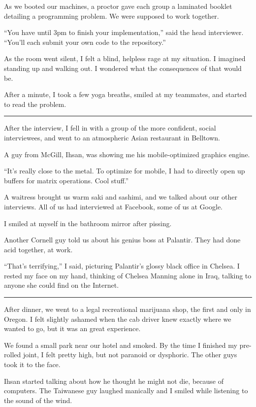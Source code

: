 As we booted our machines, a proctor gave each group a laminated booklet
detailing a programming problem.  We were supposed to work together.

``You have until 3pm to finish your implementation,'' said the head interviewer.
``You'll each submit your own code to the repository.''

As the room went silent, I felt a blind, helpless rage at my situation.  I
imagined standing up and walking out.  I wondered what the consequences of that
would be.  

After a minute, I took a few yoga breaths, smiled at my teammates, and started
to read the problem.

\plainfancybreak{12pt}{2}{* * *}

After the interview, I fell in with a group of the more confident, social
interviewees, and went to an atmospheric Asian restaurant in Belltown.

A guy from McGill, Ihsan, was showing me his mobile-optimized graphics engine.

``It's really close to the metal.  To optimize for mobile, I had to directly
open up buffers for matrix operations.  Cool stuff.''

A waitress brought us warm saki and sashimi, and we talked about our other
interviews.  All of us had interviewed at Facebook, some of us at Google.  

I smiled at myself in the bathroom mirror after pissing.

Another Cornell guy told us about his genius boss at Palantir.  They had done
acid together, at work.

``That's terrifying,'' I said, picturing Palantir's glossy black office in
Chelsea.  I rested my face on my hand, thinking of Chelsea Manning alone in
Iraq, talking to anyone she could find on the Internet.

\plainfancybreak{12pt}{2}{* * *}

After dinner, we went to a legal recreational marijuana shop, the first and only
in Oregon.  I felt slightly ashamed when the cab driver knew exactly where we
wanted to go, but it was an great experience.

We found a small park near our hotel and smoked.  By the time I finished my
pre-rolled joint, I felt pretty high, but not paranoid or dysphoric.  The other
guys took it to the face. 

Ihsan started talking about how he thought he might not die, because of
computers.  The Taiwanese guy laughed manically and I smiled while listening to
the sound of the wind. 

